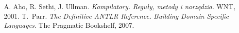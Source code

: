 
\begin{thebibliography}{1}


A. Aho, R. Sethi, J. Ullman. \emph{Kompilatory. Reguły, metody i narzędzia}.
WNT, 2001.
T.~Parr. \emph{The Definitive ANTLR Reference. Building Domain-Specific Languages}. 
The Pragmatic Bookshelf, 2007.


\end{thebibliography}

